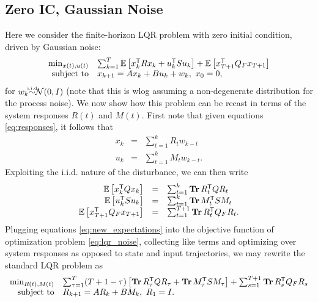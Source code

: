 \documentclass[11pt]{article}
\numberwithin{equation}{section}
\begin{document}
\subsection{Zero IC, Gaussian Noise}
Here we consider the finite-horizon LQR problem with zero initial condition, driven by Gaussian noise:
\begin{equation}
\begin{array}{rl}
\min_{x(t),u(t)} & \sum_{k=1}^T \mathbb{E}\left[x_k^{\mathsf{T}} R x_k + u_k^{\mathsf{T}} Su_k\right] + \mathbb{E}\left[x_{T+1}^{\mathsf{T}} Q_F x_{T+1}\right] \\
\mbox{subject to} & x_{k+1} = Ax_k + Bu_k + w_k, \ x_0 = 0,
\end{array}
\label{eq:lqr_noise}
\end{equation}
for $w_k {\iid}\mathcal{N}(0,I)$ (note that this is wlog assuming a non-degenerate distribution for the process noise).  We now show how this problem can be recast in terms of the system responses $R(t)$ and $M(t)$.  First note that given equations \eqref{eq:responses}, it follows that
\begin{equation}
\begin{array}{rcl}
x_k &=& \sum_{t=1}^k R_t w_{k-t} \\
u_k &=& \sum_{t=1}^k M_t w_{k-t}.
\end{array}
\label{eq:dist}
\end{equation}
Exploiting the i.i.d. nature of the disturbance, we can then write
\begin{equation}
\begin{array}{rcl}
\mathbb{E}\left[x_k^{\mathsf{T}} Q x_k\right] &=& \sum_{t=1}^k \operatorname*{\mathbf{Tr}} R_t^{\mathsf{T}} Q R_t \\
\mathbb{E}\left[u_k^{\mathsf{T}} S u_k\right] &=& \sum_{t=1}^k \operatorname*{\mathbf{Tr}} M_t^{\mathsf{T}} S M_t \\
\mathbb{E}\left[x_{T+1}^{\mathsf{T}} Q_F x_{T+1}\right] &=& \sum_{t=1}^{T+1} \operatorname*{\mathbf{Tr}} R_t^{\mathsf{T}} Q_F R_t.
\end{array}
\label{eq:new_expectations}
\end{equation}
Plugging equations \eqref{eq:new_expectations} into the objective function of optimization problem \eqref{eq:lqr_noise}, collecting like terms and optimizing over system responses as opposed to state and input trajectories, we may rewrite the standard LQR problem as
\begin{equation}
\begin{array}{rl}
\min_{R(t),M(t)} & \sum_{\tau=1}^T (T+1-\tau)\left[\operatorname*{\mathbf{Tr}} R_\tau^{\mathsf{T}} Q R_\tau + \operatorname*{\mathbf{Tr}} M_\tau^{\mathsf{T}} S M_\tau\right] + \sum_{s=1}^{T+1} \operatorname*{\mathbf{Tr}} R_s^{\mathsf{T}} Q_F R_s \\
\mbox{subject to} & R_{k+1} = AR_k + BM_k, \ R_1 = I.
\end{array}
\end{equation}
\end{document}
